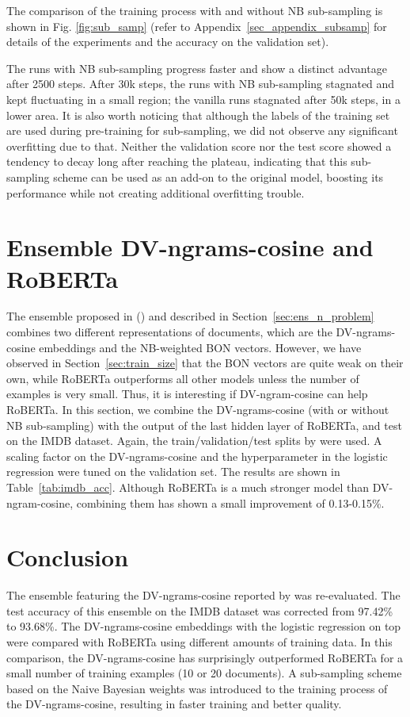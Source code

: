 \documentclass[11pt]{article}
\begin{document}
The comparison of the training process with and without NB sub-sampling is shown in Fig. \ref{fig:sub_samp} (refer to Appendix~\ref{sec_appendix_subsamp} for details of the experiments and the accuracy on the validation set).

The runs with NB sub-sampling progress faster and show a distinct advantage after 2500 steps. After 30k steps, the runs with NB sub-sampling stagnated and kept fluctuating in a small region; the vanilla runs stagnated after 50k steps, in a lower area. It is also worth noticing that although the labels of the training set are used during pre-training for sub-sampling, we did not observe any significant overfitting due to that. Neither the validation score nor the test score showed a tendency to decay long after reaching the plateau, indicating that this sub-sampling scheme can be used as an add-on to the original model, boosting its performance while not creating additional overfitting trouble.

\section{Ensemble DV-ngrams-cosine and RoBERTa}
The ensemble proposed in (\citet{thongtan-phienthrakul-2019-sentiment}) and described in Section~\ref{sec:ens_n_problem} combines two different representations of documents, which are the DV-ngrams-cosine embeddings and the NB-weighted BON vectors. However, we have observed in Section~\ref{sec:train_size} that the BON vectors are quite weak on their own, while RoBERTa outperforms all other models unless the number of examples is very small. Thus, it is interesting if DV-ngram-cosine can help RoBERTa. 
In this section, we combine the DV-ngrams-cosine (with or without NB sub-sampling) with the output of the last hidden layer of RoBERTa, and test on the IMDB dataset. Again, the train/validation/test splits by \citet{suchin2020} were used. A scaling factor on the DV-ngrams-cosine and the hyperparameter  in the logistic regression were tuned on the validation set.\newline
The results are shown in Table~\ref{tab:imdb_acc}. Although RoBERTa is a much stronger model than DV-ngram-cosine, combining them has shown a small improvement of 0.13-0.15\%.

\section{Conclusion}
The ensemble featuring the DV-ngrams-cosine reported by \citet{thongtan-phienthrakul-2019-sentiment} was re-evaluated. The test accuracy of this ensemble on the IMDB dataset was corrected from 97.42\% to 93.68\%. The DV-ngrams-cosine embeddings with the logistic regression on top were compared with RoBERTa using different amounts of training data. In this comparison, the DV-ngrams-cosine has surprisingly outperformed RoBERTa for a small number of training examples (10 or 20 documents). A sub-sampling scheme based on the Naive Bayesian weights was introduced to the training process of the DV-ngrams-cosine, resulting in faster training and better quality.
\end{document}
